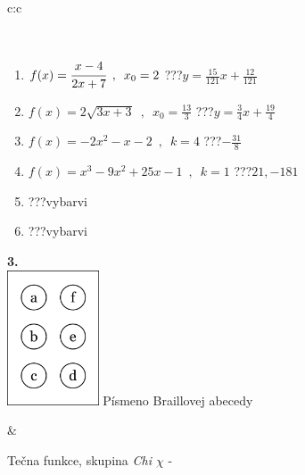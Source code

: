 \documentclass[10pt]{report}
\begin{document}
\begin{tabular}{c:c}
\begin{minipage}[c][104.5mm][t]{0.5\linewidth}
\begin{center}
\begin{minipage}{0.95\linewidth}
\begin{center}
\end{center}
\end{minipage}
\\[1mm]
\begin{minipage}{0.79\linewidth}
\begin{center}
\begin{varwidth}{\linewidth}
\begin{enumerate}
\small
\item $f(x)=\cfrac{x-4}{2x+7}\enspace , \enspace x_0=2$\quad \dotfill\; ???\;\dotfill \quad $y = \frac{15}{121}x+\frac{12}{121}$
\item $f(x)=2\sqrt{3x+3}\enspace , \enspace x_0=\frac{13}{3}$\quad \dotfill\; ???\;\dotfill \quad $y = \frac{3}{4}x+\frac{19}{4}$
\item $f(x)=-2x^2-x-2\enspace , \enspace k=4$\quad \dotfill\; ???\;\dotfill \quad $-\frac{31}{8}$
\item $f(x)=x^3-9x^2+25x-1\enspace , \enspace k=1$\quad \dotfill\; ???\;\dotfill \quad $21 , -181$
\item \quad \dotfill\; ???\;\dotfill \quad vybarvi
\item \quad \dotfill\; ???\;\dotfill \quad vybarvi
\end{enumerate}
\end{varwidth}
\end{center}
\end{minipage}
\begin{minipage}{0.20\linewidth}
\begin{center}
{\Huge\bfseries 3.} \\[2mm]
\includegraphics[height=40mm]{../images/braille.png}
{\small Písmeno Braillovej abecedy}
\end{center}
\end{minipage}
\end{center}
\end{minipage}
&
\begin{minipage}[c][104.5mm][t]{0.5\linewidth}
\begin{center}
\vspace{7mm}
{\huge Tečna funkce, skupina \textit{Chi $\chi$} -}\\[5mm]

\end{center}
\end{minipage}
\end{tabular}
\end{document}
